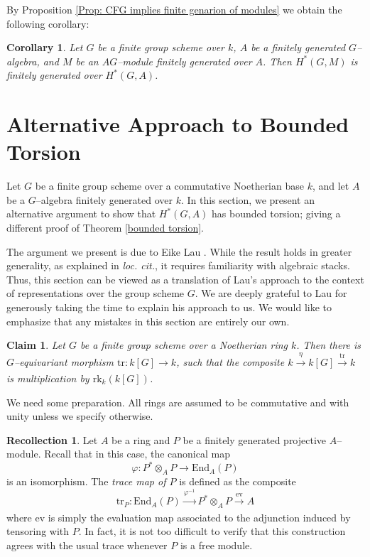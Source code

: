 \documentclass{article}
\theoremstyle{plain}
\newtheorem{Cor}[Th]{Corollary}
\newtheorem{Claim}[Th]{Claim}
\theoremstyle{definition}
\newtheorem{Rec}[Th]{Recollection}
\begin{document}
By Proposition \ref{Prop: CFG implies finite genarion of modules} we obtain the following corollary: 

\begin{Cor}
    Let $G$ be a finite group scheme over $k$, $A$ be a finitely generated $G$--algebra, and $M$ be an $AG$--module finitely generated over $A$. Then $H^\ast(G,M)$ is finitely generated over $H^\ast(G,A)$. 
\end{Cor}


\pagebreak 

\section{Alternative Approach to Bounded Torsion}\label{sec: alternative bounded}

Let $G$ be a finite group scheme over a commutative Noetherian base $k$, and let $A$ be a $G$--algebra finitely generated over $k$. In this section, we present an alternative argument to show that $H^\ast(G,A)$ has bounded torsion; giving a different proof of Theorem \ref{bounded torsion}. 

The argument we present is due to Eike Lau \cite{Lau2023}. While the result holds in greater generality, as explained in \textit{loc. cit.}, it requires familiarity with algebraic stacks. Thus, this section can be viewed as a translation of Lau's approach to the context of representations over the group scheme $G$. We are deeply grateful to Lau for generously taking the time to explain his approach to us. We would like to emphasize that any mistakes in this section are entirely our own.   

\begin{Claim}\label{claim-trace-equivariat}
    Let $G$ be a finite group scheme over a Noetherian ring $k$. Then there is $G$--equivariant morphism $\mathrm{tr}\colon k[G]\to k$, such that the composite $k\xrightarrow[]{\eta} k[G] \xrightarrow[]{\mathrm{tr}} k$ is multiplication by $\mathrm{rk}_k(k[G])$. 
\end{Claim}
 
We need some preparation.  All rings are assumed to be commutative and with unity unless we specify otherwise. 

\begin{Rec}
Let $A$ be a ring and $P$ be a finitely generated projective $A$--module. Recall that  in this case, the canonical map 
\[
\varphi\colon  P^\ast\otimes_A P \to \mathrm{End}_A(P)
\]
is an isomorphism. The \textit{trace map of $P$} is defined as the composite 
\[
\mathrm{tr}_P\colon  \mathrm{End}_A(P) \xrightarrow[]{\varphi^{-1}} P^\ast\otimes_A P \xrightarrow[]{\mathrm{ev}} A
\]
where $\mathrm{ev}$ is simply the evaluation map associated to the adjunction induced by tensoring with $P$. In fact, it is not too difficult to verify that this construction agrees with the usual trace whenever $P$ is a free module.  
\end{Rec}
\end{document}

